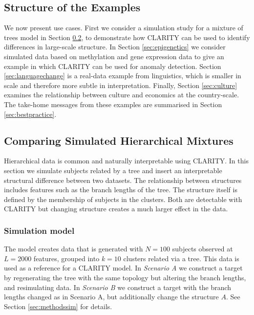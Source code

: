 \documentclass[a4]{article}
\newcommand{\+}[1]{\mathbf{#1}}
\begin{document}
\subsection{Structure of the Examples}

We now present use cases. First we consider a simulation study for a mixture of trees model in Section \ref{sec:sim}, to demonstrate how CLARITY can be used to identify differences in large-scale structure. In Section \ref{sec:epigenetics} we consider simulated data based on methylation and gene expression data to give an example in which CLARITY can be used for anomaly detection. Section \ref{sec:languagechange}  is a real-data example from linguistics, which is smaller in scale and therefore more subtle in interpretation. Finally, Section \ref{sec:culture} examines the relationship between culture and economics at the country-scale.
The take-home messages from these examples are summarised in Section \ref{sec:bestpractice}.

\subsection{Comparing Simulated Hierarchical Mixtures}
\label{sec:sim}
Hierarchical data is common and naturally interpretable using CLARITY. In this section we simulate subjects related by a tree and insert an interpretable structural difference between two datasets. The relationship between structures includes features such as the branch lengths of the tree. The structure itself is defined by the membership of subjects in the clusters. Both are detectable with CLARITY but changing structure creates a much larger effect in the data.

\subsubsection{Simulation model}

The model creates data that is generated with $N=100$ subjects observed at $L=2000$ features, grouped into $k=10$ clusters related via a tree. This data is used as a reference for a CLARITY model.  In \emph{Scenario A} we construct a target by regenerating the tree with the same topology but altering the branch lengths, and resimulating data. In \emph{Scenario B}  we construct a target with the branch lengths changed as in Scenario A, but additionally change the structure $A$. See Section \ref{sec:methodssim} for details.
\end{document}
